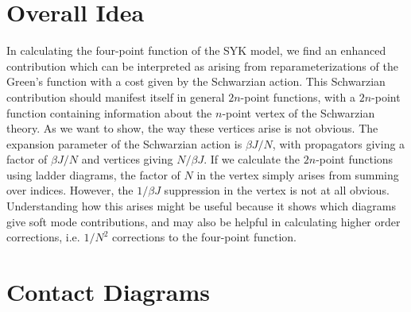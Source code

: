 \documentclass[aps,prx,preprint,onecolumn,citeautoscript,footinbib]{revtex4-1}
\begin{document}
\section{Overall Idea}
In calculating the four-point function of the SYK model, we find an enhanced contribution which can be interpreted as arising from reparameterizations of the Green's function with a cost given by the Schwarzian action. This Schwarzian contribution should manifest itself in general $2n$-point functions, with a $2n$-point function containing information about the $n$-point vertex of the Schwarzian theory. As we want to show, the way these vertices arise is not obvious. The expansion parameter of the Schwarzian action is $\beta J/N$, with propagators giving a factor of $\beta J/N$ and vertices giving $N/\beta J$. If we calculate the $2n$-point functions using ladder diagrams, the factor of $N$ in the vertex simply arises from summing over indices. However, the $1/\beta J$ suppression in the vertex is not at all obvious. Understanding how this arises might be useful because it shows which diagrams give soft mode contributions, and may also be helpful in calculating higher order corrections, i.e. $1/N^2$ corrections to the four-point function.
\section{Contact Diagrams}
\end{document}
